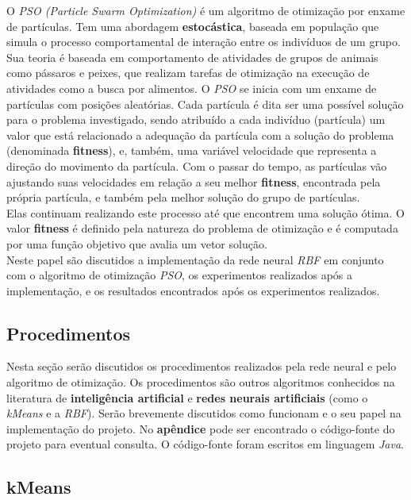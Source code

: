 \documentclass[10pt,twocolumn,letterpaper]{article}
\begin{document}
O \textit{PSO (Particle Swarm Optimization)} é um algoritmo de otimização por enxame de partículas. Tem uma abordagem \textbf{estocástica}, baseada em população que simula o processo comportamental de interação entre os indivíduos de um grupo. Sua teoria é baseada em comportamento de atividades de grupos de animais como pássaros e peixes, que realizam tarefas de otimização na execução de atividades como a busca por alimentos. O \textit{PSO} se inicia com um enxame de partículas com posições aleatórias. Cada partícula é dita ser uma possível solução para o problema investigado, sendo atribuído a cada indivíduo (partícula) um valor que está relacionado a adequação da partícula com a solução do problema (denominada \textbf{fitness}), e, também, uma variável velocidade que representa a direção do movimento da partícula. Com o passar do tempo, as partículas vão ajustando suas velocidades em relação a seu melhor \textbf{fitness}, encontrada pela própria partícula, e também pela melhor solução do grupo de partículas.\\ Elas continuam realizando este processo até que encontrem uma solução ótima. O valor \textbf{fitness} é definido pela natureza do problema de otimização e é computada por uma função objetivo que avalia um vetor solução. \\

Neste papel são discutidos a implementação da rede neural \textit{RBF} em conjunto com o algoritmo de otimização \textit{PSO}, os experimentos realizados após a implementação, e os resultados encontrados após os experimentos realizados.


\subsection{Procedimentos}
Nesta seção serão discutidos os procedimentos realizados pela rede neural e pelo algoritmo de otimização. Os procedimentos são outros algoritmos conhecidos na literatura de \textbf{inteligência artificial} e \textbf{redes neurais artificiais} (como o \textit{kMeans} e a \textit{RBF}). Serão brevemente discutidos como funcionam e o seu papel na implementação do projeto. No \textbf{apêndice} pode ser encontrado o código-fonte do projeto para eventual consulta. O código-fonte foram escritos em linguagem \textit{Java}.

\subsection{kMeans}
\end{document}
